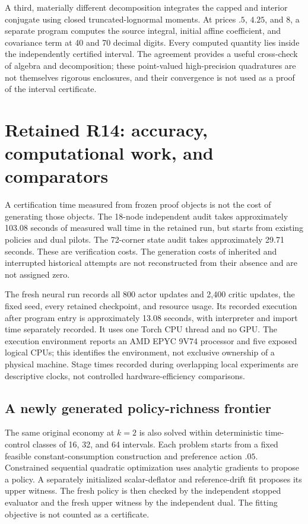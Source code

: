 A third, materially different decomposition integrates the capped and interior conjugate using closed truncated-lognormal moments. At prices $.5$, $4.25$, and $8$, a separate program computes the source integral, initial affine coefficient, and covariance term at 40 and 70 decimal digits. Every computed quantity lies inside the independently certified interval. The agreement provides a useful cross-check of algebra and decomposition; these point-valued high-precision quadratures are not themselves rigorous enclosures, and their convergence is not used as a proof of the interval certificate.

\section{Retained R14: accuracy, computational work, and comparators}\label{sec:comparison}
A certification time measured from frozen proof objects is not the cost of generating those objects. The 18-node independent audit takes approximately 103.08 seconds of measured wall time in the retained run, but starts from existing policies and dual pilots. The 72-corner state audit takes approximately 29.71 seconds. These are verification costs. The generation costs of inherited and interrupted historical attempts are not reconstructed from their absence and are not assigned zero.

The fresh neural run records all 800 actor updates and 2,400 critic updates, the fixed seed, every retained checkpoint, and resource usage. Its recorded execution after program entry is approximately 13.08 seconds, with interpreter and import time separately recorded. It uses one Torch CPU thread and no GPU. The execution environment reports an AMD EPYC 9V74 processor and five exposed logical CPUs; this identifies the environment, not exclusive ownership of a physical machine. Stage times recorded during overlapping local experiments are descriptive clocks, not controlled hardware-efficiency comparisons.

\subsection{A newly generated policy-richness frontier}
The same original economy at $k=2$ is also solved within deterministic time-control classes of 16, 32, and 64 intervals. Each problem starts from a fixed feasible constant-consumption construction and preference action $.05$. Constrained sequential quadratic optimization uses analytic gradients to propose a policy. A separately initialized scalar-deflator and reference-drift fit proposes its upper witness. The fresh policy is then checked by the independent stopped evaluator and the fresh upper witness by the independent dual. The fitting objective is not counted as a certificate.

